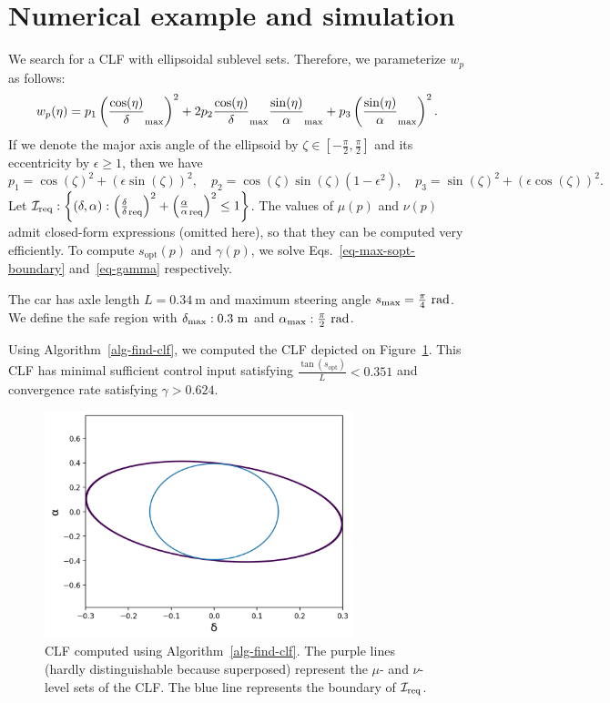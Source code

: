\documentclass{article}
\theoremstyle{plain}
\theoremstyle{definition}
\theoremstyle{remark}
\newcommand{\smax}{s_\maxtxt}
\newcommand{\sopt}{s_{\mathrm{opt}}}
\newcommand{\deltamax}{\delta_\maxtxt}
\newcommand{\alphamax}{\alpha_\maxtxt}
\newcommand{\calIreq}{\calI_{\mathrm{req}}}
\newcommand{\deltareq}{\delta_{\mathrm{req}}}
\newcommand{\alphareq}{\alpha_{\mathrm{req}}}
\begin{document}
\section{Numerical example and simulation}\label{sec-simulation}

We search for a CLF with ellipsoidal sublevel sets.
Therefore, we parameterize $w_p$ as follows:
\[
w_p(\eta) = p_1\left(\frac{\cos(\eta)}\deltamax\right)^2 + 2p_2\frac{\cos(\eta)}\deltamax\frac{\sin(\eta)}\alphamax + p_3\left(\frac{\sin(\eta)}\alphamax\right)^2.
\]
If we denote the major axis angle of the ellipsoid by $\zeta\in[-\frac\pi2,\frac\pi2]$
and its eccentricity by $\epsilon\geq1$, then we have
\[
p_1=\cos(\zeta)^2+(\epsilon\sin(\zeta))^2,\quad
p_2=\cos(\zeta)\sin(\zeta)(1-\epsilon^2),\quad
p_3=\sin(\zeta)^2+(\epsilon\cos(\zeta))^2.
\]
Let $\calIreq:\left\{(\delta,\alpha):\left(\frac\delta\deltareq\right)^2+\left(\frac\alpha\alphareq\right)^2\leq1\right\}$.
The values of $\mu(p)$ and $\nu(p)$ admit closed-form expressions (omitted here),
so that they can be computed very efficiently.
To compute $\sopt(p)$ and $\gamma(p)$, we solve Eqs.~\eqref{eq-max-sopt-boundary}
and~\eqref{eq-gamma} respectively.

The car has axle length $L=0.34~\mathrm{m}$ and maximum
steering angle $\smax=\frac\pi4~\mathrm{rad}$.
We define the safe region with $\deltamax:0.3~\mathrm{m}$ and $\alphamax:\frac\pi2~\mathrm{rad}$.

Using Algorithm~\ref{alg-find-clf}, we computed the CLF depicted on Figure~\ref{fig-clf}.
This CLF has minimal sufficient control input satisfying $\frac{\tan(\sopt)}L<0.351$
and convergence rate satisfying $\gamma>0.624$.

\begin{figure}[h]
\centering
\includegraphics[width=0.8\textwidth]{figures/clf}
\caption{CLF computed using Algorithm~\ref{alg-find-clf}.
The purple lines (hardly distinguishable because superposed)
represent the $\mu$- and $\nu$-level sets of the CLF.
The blue line represents the boundary of $\calIreq$.}
\label{fig-clf}
\end{figure}
\end{document}

